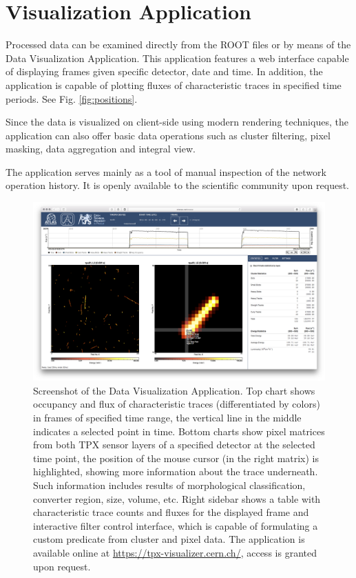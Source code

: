 

\section{\label{sec:dal}Visualization Application}
Processed data can be examined directly from the ROOT files or by means of the Data Visualization Application. \cite{Manek2016} This application features a web interface capable of displaying frames given specific detector, date and time. In addition, the application is capable of plotting fluxes of characteristic traces in specified time periods. See Fig. \ref{fig:positions}.

Since the data is visualized on client-side using modern rendering techniques, the application can also offer basic data operations such as cluster filtering, pixel masking, data aggregation and integral view.

The application serves mainly as a tool of manual inspection of the network operation history. It is openly available to the scientific community upon request.

\begin{figure}[tbp]
  \centering
  \includegraphics[clip, width=\textwidth, angle = 0 ]{Plots/screen-tpx01-crosshair-zoomed.png}
  \caption {Screenshot of the Data Visualization Application. \cite{Manek2016} Top chart shows occupancy and flux of characteristic traces (differentiated by colors) in frames of specified time range, the vertical line in the middle indicates a selected point in time. Bottom charts show pixel matrices from both TPX sensor layers of a specified detector at the selected time point, the position of the mouse cursor (in the right matrix) is highlighted, showing more information about the trace underneath. Such information includes results of morphological classification, converter region, size, volume, etc. Right sidebar shows a table with characteristic trace counts and fluxes for the displayed frame and interactive filter control interface, which is capable of formulating a custom predicate from cluster and pixel data. The application is available online at \url{https://tpx-visualizer.cern.ch/}, access is granted upon request.}
  \label{fig:visualizer}
\end{figure}
